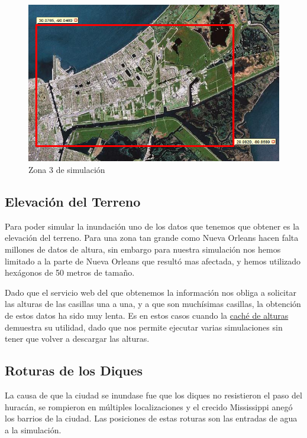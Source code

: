\begin{figure}[H]
 \centering
 \includegraphics[width=135mm]{figuras/cap6/NOarea4.png}
 \caption{Zona 3 de simulación}
\end{figure}

\subsection{Elevación del Terreno}

Para poder simular la inundación uno de los datos que tenemos que obtener es
la elevación del terreno. Para una zona tan grande como Nueva Orleans hacen
falta millones de datos de altura, sin embargo para nuestra simulación nos hemos
limitado a la parte de Nueva Orleans que resultó mas afectada, y hemos utilizado
hexágonos de 50 metros de tamaño.

Dado que el servicio web del que obtenemos la información nos obliga a
solicitar las alturas de las casillas una a una, y a que son muchísimas
casillas, la obtención de estos datos ha sido muy lenta. Es en estos casos
cuando la \hyperref[cache]{caché de alturas} demuestra su utilidad, dado que
nos permite ejecutar varias simulaciones sin tener que volver a descargar las
alturas.

\subsection{Roturas de los Diques}

La causa de que la ciudad se inundase fue que los diques no resistieron el paso
del huracán, se rompieron en múltiples localizaciones y el crecido Mississippi
anegó los barrios de la ciudad. Las posiciones\cite{Pennington06} de estas
roturas son las entradas de agua a la simulación.

